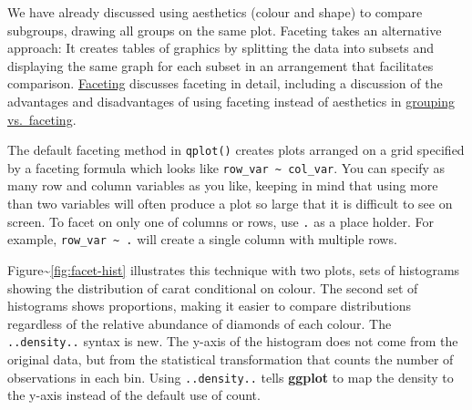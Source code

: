 We have already discussed using aesthetics (colour and shape) to compare
subgroups, drawing all groups on the same plot. Faceting takes an
alternative approach: It creates tables of graphics by splitting the
data into subsets and displaying the same graph for each subset in an
arrangement that facilitates comparison.
\hyperref[sec:faceting]{Faceting} discusses faceting in detail,
including a discussion of the advantages and disadvantages of using
faceting instead of aesthetics in \hyperref[sub:group-vs-facet]{grouping
vs.~faceting}. 

The default faceting method in \texttt{qplot()} creates plots arranged
on a grid specified by a faceting formula which looks like
\texttt{row\_var \textasciitilde{} col\_var}. You can specify as many
row and column variables as you like, keeping in mind that using more
than two variables will often produce a plot so large that it is
difficult to see on screen. To facet on only one of columns or rows, use
\texttt{.} as a place holder. For example,
\texttt{row\_var \textasciitilde{} .} will create a single column with
multiple rows. 

Figure\textasciitilde{}\ref{fig:facet-hist} illustrates this technique
with two plots, sets of histograms showing the distribution of carat
conditional on colour. The second set of histograms shows proportions,
making it easier to compare distributions regardless of the relative
abundance of diamonds of each colour. The \texttt{..density..} syntax is
new. The y-axis of the histogram does not come from the original data,
but from the statistical transformation that counts the number of
observations in each bin. Using \texttt{..density..} tells
\textbf{ggplot} to map the density to the y-axis instead of the default
use of count.

\begin{Shaded}
\begin{Highlighting}[]
  \StringTok{ }
   \NormalTok{, } \NormalTok{, } \NormalTok{(}\NormalTok{, }\NormalTok{))}
  \StringTok{ }
   \NormalTok{, } \NormalTok{, } \NormalTok{(}\NormalTok{, }\NormalTok{))}
\end{Highlighting}
\end{Shaded}

